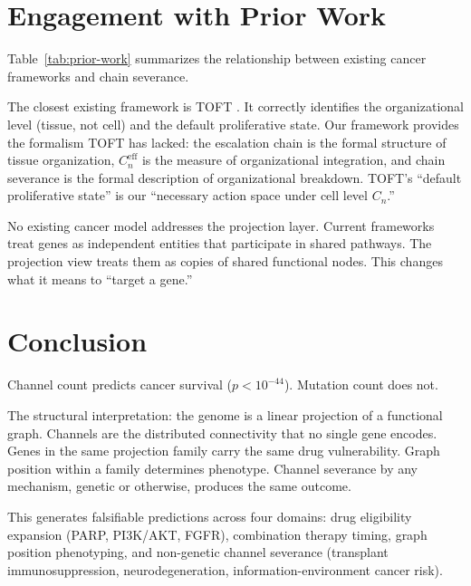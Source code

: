 \documentclass[11pt]{article}
\begin{document}
\section{Engagement with Prior Work}
\label{sec:prior}

Table~\ref{tab:prior-work} summarizes the relationship between
existing cancer frameworks and chain severance.

The closest existing framework is TOFT \cite{Sonnenschein2000}.
It correctly identifies the organizational level (tissue, not cell)
and the default proliferative state. Our framework provides the
formalism TOFT has lacked: the escalation chain is the formal
structure of tissue organization, $C_n^{\mathrm{eff}}$ is the
measure of organizational integration, and chain severance is
the formal description of organizational breakdown. TOFT's
``default proliferative state'' is our ``necessary action space
under cell level $C_n$.''

No existing cancer model addresses the projection layer. Current
frameworks treat genes as independent entities that participate in
shared pathways. The projection view treats them as copies of shared
functional nodes. This changes what it means to ``target a gene.''

\section{Conclusion}
\label{sec:conclusion}

Channel count predicts cancer survival ($p < 10^{-44}$). Mutation
count does not.

The structural interpretation: the genome is a linear projection
of a functional graph. Channels are the distributed connectivity
that no single gene encodes. Genes in the same projection family
carry the same drug vulnerability. Graph position within a family
determines phenotype. Channel severance by any mechanism, genetic
or otherwise, produces the same outcome.

This generates falsifiable predictions across four domains:
drug eligibility expansion (PARP, PI3K/AKT, FGFR), combination
therapy timing, graph position phenotyping, and non-genetic
channel severance (transplant immunosuppression, neurodegeneration,
information-environment cancer risk).
\end{document}
